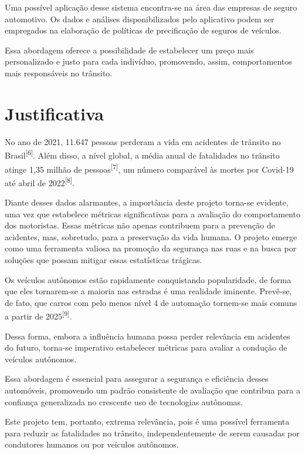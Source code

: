 Uma possível aplicação desse sistema encontra-se na área das empresas de seguro automotivo. Os dados e análises disponibilizados pelo aplicativo podem ser empregados na elaboração de políticas de precificação de seguros de veículos. 

Essa abordagem oferece a possibilidade de estabelecer um preço mais personalizado e justo para cada indivíduo, promovendo, assim, comportamentos mais responsáveis no trânsito. 


 
\section{Justificativa}
No ano de 2021, 11.647 pessoas perderam a vida em acidentes de trânsito no Brasil\textsuperscript{[6]}. Além disso, a nível global, a média anual de fatalidades no trânsito atinge 1,35 milhão de pessoas\textsuperscript{[7]}, um número comparável às mortes por Covid-19 até abril de 2022\textsuperscript{[8]}.

Diante desses dados alarmantes, a importância deste projeto torna-se evidente, uma vez que estabelece métricas significativas para a avaliação do comportamento dos motoristas. Essas métricas não apenas contribuem para a prevenção de acidentes, mas, sobretudo, para a preservação da vida humana. O projeto emerge como uma ferramenta valiosa na promoção da segurança nas ruas e na busca por soluções que possam mitigar essas estatísticas trágicas.

Os veículos autônomos estão rapidamente conquistando popularidade, de forma que eles tornarem-se a maioria nas estradas é uma realidade iminente. Prevê-se, de fato, que carros com pelo menos nível 4 de automação tornem-se mais comuns a partir de 2025\textsuperscript{[9]}.

Dessa forma, embora a influência humana possa perder relevância em acidentes do futuro, torna-se imperativo estabelecer métricas para avaliar a condução de veículos autônomos. 

Essa abordagem é essencial para assegurar a segurança e eficiência desses automóveis, promovendo um padrão consistente de avaliação que contribua para a confiança generalizada no crescente uso de tecnologias autônomas.

Este projeto tem, portanto, extrema relevância, pois é uma possível ferramenta para reduzir as fatalidades no trânsito, independentemente de serem causadas por condutores humanos ou por veículos autônomos.

